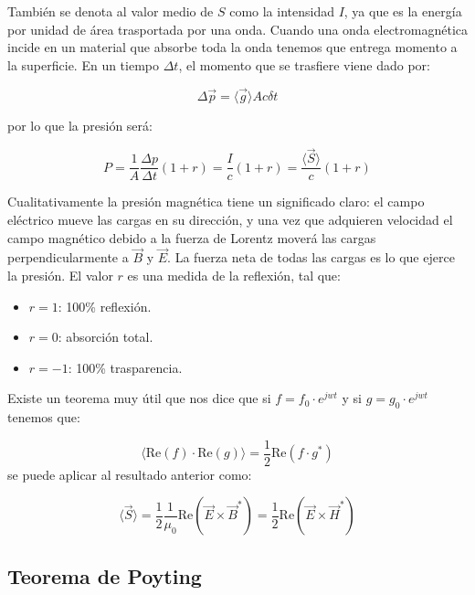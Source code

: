 \documentclass[12pt]{article}
\newcommand{\Real}{\mathrm{Re}}
\begin{document}
También se denota al valor medio de $S$ como la intensidad $I$, ya que es la energía por unidad de área trasportada por una onda. Cuando una onda electromagnética incide en un material que absorbe toda la onda tenemos que entrega momento a la superficie. En un tiempo $\Delta t$, el momento que se trasfiere viene dado por:

\begin{equation}
\Delta \vec{p} = \langle \vec{g} \rangle A c \delta t
\end{equation} 

por lo que la presión será:

\begin{equation}
P = \dfrac{1}{A} \dfrac{\Delta p}{\Delta t} (1+r) = \dfrac{I}{c} (1+r) = \dfrac{\langle \vec{S} \rangle}{c} (1+r) 
\end{equation}

Cualitativamente la presión magnética tiene un significado claro: el campo eléctrico mueve las cargas en su dirección, y una vez que adquieren velocidad el campo magnético debido a la fuerza de Lorentz moverá las cargas perpendicularmente a $\vec{B}$ y $\vec{E}$. La fuerza neta de todas las cargas es lo que ejerce la presión. El valor $r$ es una medida de la reflexión, tal que:

\begin{itemize}
\item $r=1$: 100\% reflexión.
\item $r=0$: absorción total.
\item $r=-1$: 100\% trasparencia.
\end{itemize}

Existe un teorema muy útil que nos dice que si $f=f_0 \cdot e^{jwt}$ y si $g = g_0 \cdot e^{jwt}$ tenemos que:

\begin{equation}
\langle \Real (f) \cdot \Real (g) \rangle = \dfrac{1}{2} \Real (f \cdot g ^*)
\end{equation}
se puede aplicar al resultado anterior como:

\begin{equation}
\langle \vec{S} \rangle = \dfrac{1}{2} \dfrac{1}{\mu_0} \Real (\vec{E} \times \vec{B}^* ) = \dfrac{1}{2} \Real (\vec{E} \times \vec{H}^*) 
\end{equation}

\subsection{Teorema de Poyting}
\end{document}
